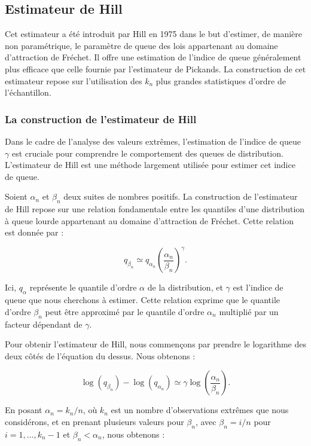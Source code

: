 \documentclass{article}
\theoremstyle{plain}
\theoremstyle{definition}
\theoremstyle{plain}
\begin{document}
\subsection{Estimateur de Hill}
Cet estimateur a été introduit par Hill en 1975 dans le but d’estimer, de manière non paramétrique, le paramètre de queue des lois appartenant au domaine d’attraction de Fréchet. Il offre une estimation de l’indice de queue généralement plus efficace que celle fournie par l’estimateur de Pickands. La construction de cet estimateur repose sur l’utilisation des $k_n$ plus grandes statistiques d’ordre de l’échantillon.



\subsubsection{La construction de l’estimateur de Hill}
Dans le cadre de l'analyse des valeurs extrêmes, l'estimation de l'indice de queue \(\gamma\) est cruciale pour comprendre le comportement des queues de distribution. L'estimateur de Hill est une méthode largement utilisée pour estimer cet indice de queue.

Soient \(\alpha_n\) et \(\beta_n\) deux suites de nombres positifs. La construction de l'estimateur de Hill repose sur une relation fondamentale entre les quantiles d’une distribution à queue lourde appartenant au domaine d’attraction de Fréchet. Cette relation est donnée par :

\[
    q_{\beta_n} \simeq q_{\alpha_n} \left( \frac{\alpha_n}{\beta_n} \right)^{\gamma}.
\]

Ici, \(q_{\alpha}\) représente le quantile d'ordre \(\alpha\) de la distribution, et \(\gamma\) est l'indice de queue que nous cherchons à estimer. Cette relation exprime que le quantile d'ordre \(\beta_n\) peut être approximé par le quantile d'ordre \(\alpha_n\) multiplié par un facteur dépendant de \(\gamma\).

Pour obtenir l'estimateur de Hill, nous commençons par prendre le logarithme des deux côtés de l'équation du dessus. Nous obtenons :

\[
\log(q_{\beta_n}) - \log(q_{\alpha_n}) \simeq \gamma \log\left( \frac{\alpha_n}{\beta_n} \right).
\]

En posant $\alpha_n = k_n/n$, où \(k_n\) est un nombre d'observations extrêmes que nous considérons, et en prenant plusieurs valeurs pour \(\beta_n\), avec \(\beta_n = i/n\) pour \(i = 1, \ldots, k_n - 1\) et \(\beta_n < \alpha_n\), nous obtenons :
\end{document}
